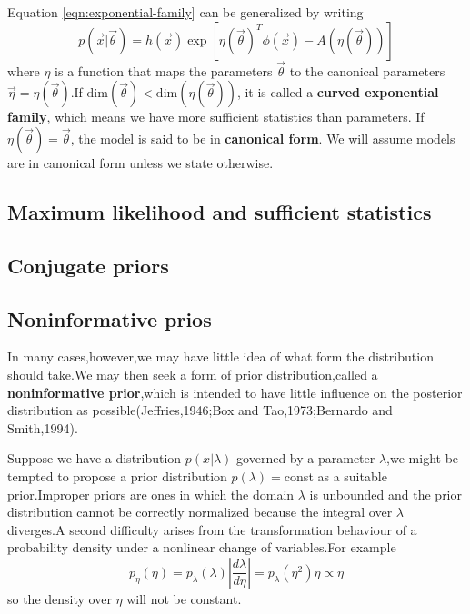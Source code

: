 Equation \ref{eqn:exponential-family} can be generalized by writing
\begin{equation}
p(\vec{x}|\vec{\theta}) = h(\vec{x})\exp[\eta(\vec{\theta})^T\phi(\vec{x})-A(\eta(\vec{\theta}))]
\end{equation}
where $\eta$ is a function that maps the parameters $\vec{\theta}$ to the canonical parameters $\vec{\eta}=\eta(\vec{\theta})$.If $\mathrm{dim}(\vec{\theta})<\mathrm{dim}(\eta(\vec{\theta}))$, it is called a \textbf{curved exponential family}, which means we have more sufficient statistics than parameters. If $\eta(\vec{\theta})=\vec{\theta}$, the model is said to be in \textbf{canonical form}. We will assume models are in canonical form unless we state otherwise.

\subsection{Maximum likelihood and sufficient statistics}

\subsection{Conjugate priors}

\subsection{Noninformative prios}
In many cases,however,we may have little idea of what form the distribution should take.We may then seek a form of prior distribution,called a \textbf{noninformative prior},which is intended to have little influence on the posterior distribution as possible(Jeffries,1946;Box and Tao,1973;Bernardo and Smith,1994).

Suppose we have a distribution $p(x|\lambda)$ governed by a parameter $\lambda$,we might be tempted to propose a prior distribution $p(\lambda) = $const as a suitable prior.Improper priors are ones in which the domain $\lambda$ is unbounded and the prior distribution cannot be correctly normalized because the integral over $\lambda$ diverges.A second difficulty arises from the transformation behaviour of a probability density under a nonlinear change of variables.For example
\begin{equation}
p_\eta(\eta) = p_\lambda(\lambda) \left | \dfrac{d\lambda}{d\eta} \right | = p_\lambda(\eta^2)\eta\propto \eta
\end{equation}
so the density over $\eta$ will not be constant.

